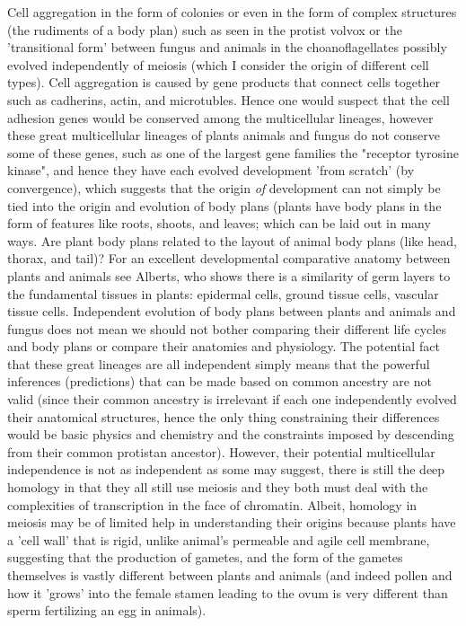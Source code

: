 Cell aggregation in the form of colonies or even in the form of complex structures (the rudiments of a body plan) such as seen in the protist volvox or the 'transitional form' between fungus and animals in the choanoflagellates possibly evolved independently of meiosis (which I consider the origin of different cell types).  Cell aggregation is caused by gene products that connect cells together such as cadherins, actin, and microtubles.  Hence one would suspect that the cell adhesion genes would be conserved among the multicellular lineages, however these great multicellular lineages of plants animals and fungus do not conserve some of these genes, such as one of the largest gene families the "receptor tyrosine kinase", and hence they have each evolved development 'from scratch' (by convergence), which suggests that the origin \textit{of} development can not simply be tied into the origin and evolution of body plans (plants have body plans in the form of features like roots, shoots, and leaves; which can be laid out in many ways.  Are plant body plans related to the layout of animal body plans (like head, thorax, and tail)?  For an excellent developmental comparative anatomy between plants and animals see Alberts\cite{Molbiocell}, who shows there is a similarity of germ layers to the fundamental tissues in plants: epidermal cells, ground tissue cells, vascular tissue cells.  Independent evolution of body plans between plants and animals and fungus does not mean we should not bother comparing their different life cycles and body plans or compare their anatomies and physiology.  The potential fact that these great lineages are all independent simply means that the powerful inferences (predictions) that can be made based on common ancestry are not valid (since their common ancestry is irrelevant if each one independently evolved their anatomical structures, hence the only thing constraining their differences would be basic physics and chemistry and the constraints imposed by descending from their common protistan ancestor).  However, their potential multicellular independence is not as independent as some may suggest, there is still the deep homology in that they all still use meiosis and they both must deal with the complexities of transcription in the face of chromatin.  Albeit, homology in meiosis may be of limited help in understanding their origins because plants have a 'cell wall' that is rigid, unlike animal's permeable and agile cell membrane, suggesting that the production of gametes, and the form of the gametes themselves is vastly different between plants and animals (and indeed pollen and how it 'grows' into the female stamen leading to the ovum is very different than sperm fertilizing an egg in animals). 

